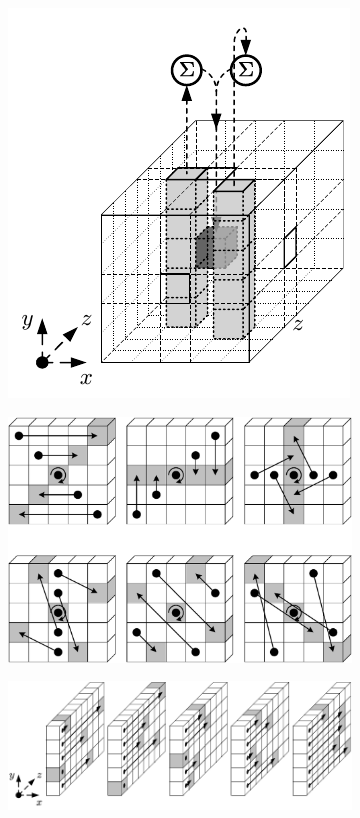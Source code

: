 \documentclass{article}
\begin{document}
\begin{itemize}
\begin{figure}[H]
    \begin{subfigure}{.5\textwidth}
        \centering
        \includegraphics[scale=0.8]{images/theta_step}
    \end{subfigure}%
    \begin{subfigure}{.5\textwidth}
        \centering
        \includegraphics[scale=0.35]{images/pi_step}
    \end{subfigure}
    \begin{subfigure}{.5\textwidth}
        \centering
        \includegraphics[scale=0.7]{images/rho_step}

\end{subfigure}
\end{figure}
\end{itemize}
\end{document}
